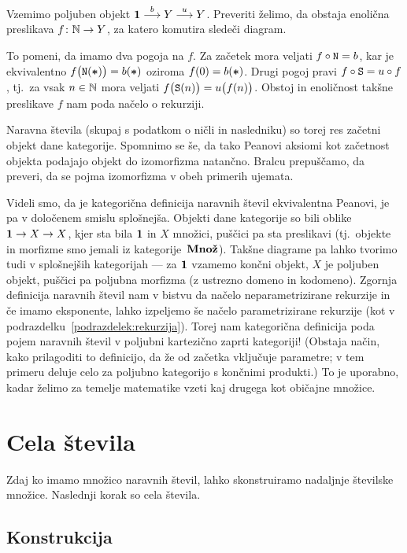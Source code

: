 Vzemimo poljuben objekt $\mathtt{\mathbf{1}} \stackrel{b}{\longrightarrow} Y \stackrel{u}{\longrightarrow} Y$. Preveriti želimo, da obstaja enolična preslikava $f\colon \mathbb{N} \to Y$, za katero komutira sledeči diagram.


To pomeni, da imamo dva pogoja na $f$. Za začetek mora veljati $f \circ \mathtt{N} = b$, kar je ekvivalentno $f\big(\mathtt{N}(\mathord{\boldsymbol{*}})\big) = b(\mathord{\boldsymbol{*}})$ oziroma $f(0) = b(\mathord{\boldsymbol{*}})$. Drugi pogoj pravi $f \circ \mathtt{S} = u \circ f$, tj.~za vsak $n \in \mathbb{N}$ mora veljati $f\big(\mathtt{S}(n)\big) = u\big(f(n)\big)$. Obstoj in enoličnost takšne preslikave $f$ nam poda načelo o rekurziji.

Naravna števila (skupaj s podatkom o ničli in nasledniku) so torej res začetni objekt dane kategorije. Spomnimo se še, da tako Peanovi aksiomi kot začetnost objekta podajajo objekt do izomorfizma natančno. Bralcu prepuščamo, da preveri, da se pojma izomorfizma v obeh primerih ujemata.

Videli smo, da je kategorična definicija naravnih števil ekvivalentna Peanovi, je pa v določenem smislu splošnejša. Objekti dane kategorije so bili oblike $\mathtt{\mathbf{1}} \to X \to X$, kjer sta bila $\mathtt{\mathbf{1}}$ in $X$ množici, puščici pa sta preslikavi (tj.~objekte in morfizme smo jemali iz kategorije~$\mathbf{Mno\check{z}}$). Takšne diagrame pa lahko tvorimo tudi v splošnejših kategorijah --- za $\mathtt{\mathbf{1}}$ vzamemo končni objekt, $X$ je poljuben objekt, puščici pa poljubna morfizma (z ustrezno domeno in kodomeno). Zgornja definicija naravnih števil nam v bistvu da načelo neparametrizirane rekurzije in če imamo eksponente, lahko izpeljemo še načelo parametrizirane rekurzije (kot v podrazdelku~\ref{podrazdelek:rekurzija}). Torej nam kategorična definicija poda pojem naravnih števil v poljubni kartezično zaprti kategoriji! (Obstaja način, kako prilagoditi to definicijo, da že od začetka vključuje parametre; v tem primeru deluje celo za poljubno kategorijo s končnimi produkti.) To je uporabno, kadar želimo za temelje matematike vzeti kaj drugega kot običajne množice.


\section{Cela števila}

Zdaj ko imamo množico naravnih števil, lahko skonstruiramo nadaljnje številske množice. Naslednji korak so cela števila.

\subsection{Konstrukcija}

